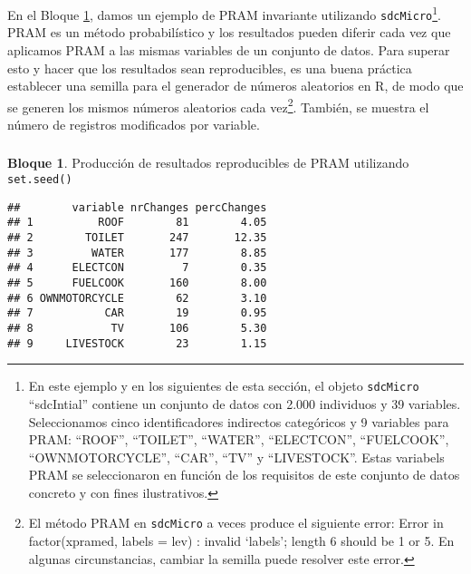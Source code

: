 \documentclass[
]{book}
\newenvironment{Shaded}{\begin{snugshade}}{\end{snugshade}}
\newcommand{\AttributeTok}[1]{\textcolor[rgb]{0.77,0.63,0.00}{#1}}
\newcommand{\CommentTok}[1]{\textcolor[rgb]{0.56,0.35,0.01}{\textit{#1}}}
\newcommand{\DecValTok}[1]{\textcolor[rgb]{0.00,0.00,0.81}{#1}}
\newcommand{\FunctionTok}[1]{\textcolor[rgb]{0.00,0.00,0.00}{#1}}
\newcommand{\NormalTok}[1]{#1}
\newcommand{\OtherTok}[1]{\textcolor[rgb]{0.56,0.35,0.01}{#1}}
\newcommand{\SpecialCharTok}[1]{\textcolor[rgb]{0.00,0.00,0.00}{#1}}
\theoremstyle{definition}
\theoremstyle{definition}
\newtheorem{example}{Bloque}[chapter]
\theoremstyle{definition}
\theoremstyle{definition}
\theoremstyle{remark}
\begin{document}
En el Bloque \ref{exm:bloque26jgm}, damos un ejemplo de PRAM invariante utilizando \texttt{sdcMicro}\footnote{En este ejemplo y en los siguientes de esta sección, el objeto \texttt{sdcMicro} ``sdcIntial'' contiene un conjunto de datos con 2.000 individuos y 39 variables. Seleccionamos cinco identificadores indirectos categóricos y 9 variables para PRAM: ``ROOF'', ``TOILET'', ``WATER'', ``ELECTCON'', ``FUELCOOK'', ``OWNMOTORCYCLE'', ``CAR'', ``TV'' y ``LIVESTOCK''. Estas variabels PRAM se seleccionaron en función de los requisitos de este conjunto de datos concreto y con fines ilustrativos.}. PRAM es un método probabilístico y los resultados pueden diferir cada vez que aplicamos PRAM a las mismas variables de un conjunto de datos. Para superar esto y hacer que los resultados sean reproducibles, es una buena práctica establecer una semilla para el generador de números aleatorios en R, de modo que se generen los mismos números aleatorios cada vez\footnote{El método PRAM en \texttt{sdcMicro} a veces produce el siguiente error: Error in factor(xpramed, labels = lev) : invalid `labels'; length 6 should be 1 or 5. En algunas circunstancias, cambiar la semilla puede resolver este error.}. También, se muestra el número de registros modificados por variable.

\hypertarget{section}{%
\subsubsection{}\label{section}}

\begin{example}
\protect\hypertarget{exm:bloque26jgm}{}\label{exm:bloque26jgm}Producción de resultados reproducibles de PRAM utilizando \texttt{set.seed()}
\end{example}

\begin{Shaded}
\end{Shaded}

\begin{verbatim}
##        variable nrChanges percChanges
## 1          ROOF        81        4.05
## 2        TOILET       247       12.35
## 3         WATER       177        8.85
## 4      ELECTCON         7        0.35
## 5      FUELCOOK       160        8.00
## 6 OWNMOTORCYCLE        62        3.10
## 7           CAR        19        0.95
## 8            TV       106        5.30
## 9     LIVESTOCK        23        1.15
\end{verbatim}
\end{document}
